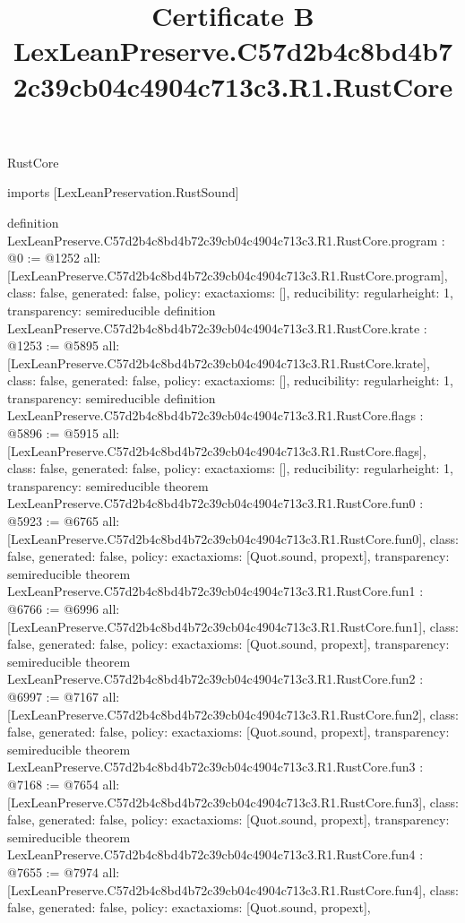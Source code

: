 \begin{lexlean}{RustCore}
\title{Certificate B LexLeanPreserve.C57d2b4c8bd4b72c39cb04c4904c713c3.R1.RustCore}
\begin{coremodule}
imports [LexLeanPreservation.RustSound]

definition LexLeanPreserve.C57d2b4c8bd4b72c39cb04c4904c713c3.R1.RustCore.program : @0 := @1252 {
  all: [LexLeanPreserve.C57d2b4c8bd4b72c39cb04c4904c713c3.R1.RustCore.program],
  class: false,
  generated: false,
  policy: exact{axioms: []},
  reducibility: regular{height: 1},
  transparency: semireducible
}
definition LexLeanPreserve.C57d2b4c8bd4b72c39cb04c4904c713c3.R1.RustCore.krate : @1253 := @5895 {
  all: [LexLeanPreserve.C57d2b4c8bd4b72c39cb04c4904c713c3.R1.RustCore.krate],
  class: false,
  generated: false,
  policy: exact{axioms: []},
  reducibility: regular{height: 1},
  transparency: semireducible
}
definition LexLeanPreserve.C57d2b4c8bd4b72c39cb04c4904c713c3.R1.RustCore.flags : @5896 := @5915 {
  all: [LexLeanPreserve.C57d2b4c8bd4b72c39cb04c4904c713c3.R1.RustCore.flags],
  class: false,
  generated: false,
  policy: exact{axioms: []},
  reducibility: regular{height: 1},
  transparency: semireducible
}
theorem LexLeanPreserve.C57d2b4c8bd4b72c39cb04c4904c713c3.R1.RustCore.fun0 : @5923 := @6765 {
  all: [LexLeanPreserve.C57d2b4c8bd4b72c39cb04c4904c713c3.R1.RustCore.fun0],
  class: false,
  generated: false,
  policy: exact{axioms: [Quot.sound, propext]},
  transparency: semireducible
}
theorem LexLeanPreserve.C57d2b4c8bd4b72c39cb04c4904c713c3.R1.RustCore.fun1 : @6766 := @6996 {
  all: [LexLeanPreserve.C57d2b4c8bd4b72c39cb04c4904c713c3.R1.RustCore.fun1],
  class: false,
  generated: false,
  policy: exact{axioms: [Quot.sound, propext]},
  transparency: semireducible
}
theorem LexLeanPreserve.C57d2b4c8bd4b72c39cb04c4904c713c3.R1.RustCore.fun2 : @6997 := @7167 {
  all: [LexLeanPreserve.C57d2b4c8bd4b72c39cb04c4904c713c3.R1.RustCore.fun2],
  class: false,
  generated: false,
  policy: exact{axioms: [Quot.sound, propext]},
  transparency: semireducible
}
theorem LexLeanPreserve.C57d2b4c8bd4b72c39cb04c4904c713c3.R1.RustCore.fun3 : @7168 := @7654 {
  all: [LexLeanPreserve.C57d2b4c8bd4b72c39cb04c4904c713c3.R1.RustCore.fun3],
  class: false,
  generated: false,
  policy: exact{axioms: [Quot.sound, propext]},
  transparency: semireducible
}
theorem LexLeanPreserve.C57d2b4c8bd4b72c39cb04c4904c713c3.R1.RustCore.fun4 : @7655 := @7974 {
  all: [LexLeanPreserve.C57d2b4c8bd4b72c39cb04c4904c713c3.R1.RustCore.fun4],
  class: false,
  generated: false,
  policy: exact{axioms: [Quot.sound, propext]},
}
\end{coremodule}
\end{lexlean}
